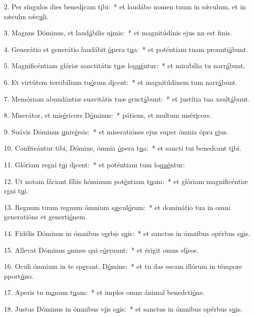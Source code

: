 2. Per síngulos dies bened\uline{í}cam t\uline{i}bi:~* et laudábo nomen tuum in sǽculum, et in sǽculm sǽc\uline{u}li.\par 
3. Magnus Dóminus, et laud\uline{á}bilis n\uline{i}mis:~* et magnitúdinis ejus nn est f\uline{i}nis.\par 
4. Generátio et generátio laudábit \uline{ó}pera t\uline{u}a:~* et poténtiam tuam pronnti\uline{á}bunt.\par 
5. Magnificéntiam glóriæ sanctitátis t\uline{u}æ lo\uline{qué}ntur:~* et mirabília tu narr\uline{á}bunt.\par 
6. Et virtútem terribílium tu\uline{ó}rum d\uline{i}cent:~* et magnitúdinem tum narr\uline{á}bunt.\par 
7. Memóriam abundántiæ suavitátis tuæ \uline{e}ruct\uline{á}bunt:~* et justítia tua xsult\uline{á}bunt.\par 
8. Miserátor, et mis\uline{é}ricors D\uline{ó}minus:~* pátiens, et multum msér\uline{i}cors.\par 
9. Suávis Dóminus \uline{u}niv\uline{é}rsis:~* et miseratiónes ejus super ómnia ópra \uline{e}jus.\par 
10. Confiteántur tibi, Dómine, ómnia \uline{ó}pera t\uline{u}a:~* et sancti tui benedcant t\uline{i}bi.\par 
11. Glóriam regni t\uline{u}i d\uline{i}cent:~* et poténtiam tum lo\uline{qué}ntur:\par 
12. Ut notam fáciant fíliis hóminum pot\uline{é}ntiam t\uline{u}am:~* et glóriam magnificéntiæ rgni t\uline{u}i.\par 
13. Regnum tuum regnum ómnium s\uline{æ}cul\uline{ó}rum:~* et dominátio tua in omni generatióne et generti\uline{ó}nem.\par 
14. Fidélis Dóminus in ómnibus v\uline{e}rbis s\uline{u}is:~* et sanctus in ómnibus opérbus s\uline{u}is.\par 
15. Allevat Dóminus \uline{o}mnes qui c\uline{ó}rruunt:~* et érigit omns el\uline{í}sos.\par 
16. Oculi ómnium in te sp\uline{e}rant, D\uline{ó}mine:~* et tu das escam illórum in témpore pport\uline{ú}no.\par 
17. Aperis tu m\uline{a}num t\uline{u}am:~* et imples omne ánimal benedcti\uline{ó}ne.\par 
18. Justus Dóminus in ómnibus v\uline{i}is s\uline{u}is:~* et sanctus in ómnibus opérbus s\uline{u}is.\par 
